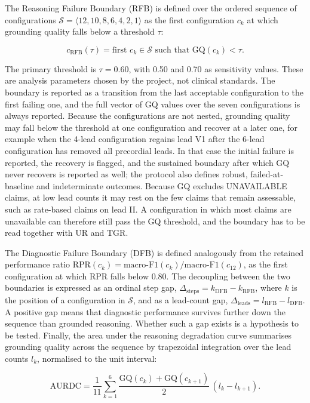 The Reasoning Failure Boundary (RFB) is defined over the ordered sequence of configurations $\mathcal{S} = \langle 12, 10, 8, 6, 4, 2, 1 \rangle$ as the first configuration $c_k$ at which grounding quality falls below a threshold $\tau$:

\[
c_{\text{RFB}}(\tau) = \text{first } c_k \in \mathcal{S} \text{ such that } \text{GQ}(c_k) < \tau.
\]

The primary threshold is $\tau = 0.60$, with 0.50 and 0.70 as sensitivity values. These are analysis parameters chosen by the project, not clinical standards. The boundary is reported as a transition from the last acceptable configuration to the first failing one, and the full vector of GQ values over the seven configurations is always reported. Because the configurations are not nested, grounding quality may fall below the threshold at one configuration and recover at a later one, for example when the 4-lead configuration regains lead V1 after the 6-lead configuration has removed all precordial leads. In that case the initial failure is reported, the recovery is flagged, and the sustained boundary after which GQ never recovers is reported as well; the protocol also defines robust, failed-at-baseline and indeterminate outcomes. Because GQ excludes UNAVAILABLE claims, at low lead counts it may rest on the few claims that remain assessable, such as rate-based claims on lead II. A configuration in which most claims are unavailable can therefore still pass the GQ threshold, and the boundary has to be read together with UR and TGR.

The Diagnostic Failure Boundary (DFB) is defined analogously from the retained performance ratio $\text{RPR}(c_k) = \text{macro-F1}(c_k)/\text{macro-F1}(c_{12})$, as the first configuration at which RPR falls below 0.80. The decoupling between the two boundaries is expressed as an ordinal step gap, $\Delta_{\text{steps}} = k_{\text{DFB}} - k_{\text{RFB}}$, where $k$ is the position of a configuration in $\mathcal{S}$, and as a lead-count gap, $\Delta_{\text{leads}} = l_{\text{RFB}} - l_{\text{DFB}}$. A positive gap means that diagnostic performance survives further down the sequence than grounded reasoning. Whether such a gap exists is a hypothesis to be tested. Finally, the area under the reasoning degradation curve summarises grounding quality across the sequence by trapezoidal integration over the lead counts $l_k$, normalised to the unit interval:

\[
\text{AURDC} = \frac{1}{11}\sum_{k=1}^{6} \frac{\text{GQ}(c_k) + \text{GQ}(c_{k+1})}{2}\,(l_k - l_{k+1}).
\]

